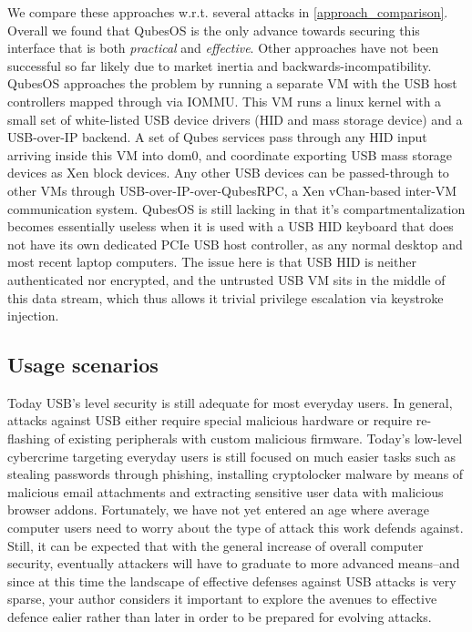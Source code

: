 \documentclass[12pt,a4paper,notitlepage]{article}
\begin{document}
We compare these approaches w.r.t. several attacks in \ref{approach_comparison}. Overall we found that QubesOS is the
only advance towards securing this interface that is both \emph{practical} and \emph{effective}. Other approaches have
not been successful so far likely due to market inertia and backwards-incompatibility.
QubesOS approaches the problem by running a separate VM with the USB host controllers mapped through via IOMMU. This VM
runs a linux kernel with a small set of white-listed USB device drivers (HID and mass storage device) and a USB-over-IP
backend. A set of Qubes services pass through any HID input arriving inside this VM into dom0, and coordinate exporting
USB mass storage devices as Xen block devices. Any other USB devices can be passed-through to other VMs through
USB-over-IP-over-QubesRPC, a Xen vChan-based inter-VM communication system.
QubesOS is still lacking in that it's compartmentalization becomes essentially useless when it is used with a USB HID
keyboard that does not have its own dedicated PCIe USB host controller, as any normal desktop and most recent laptop
computers. The issue here is that USB HID is neither authenticated nor encrypted, and the untrusted USB VM sits in the
middle of this data stream, which thus allows it trivial privilege escalation via keystroke injection.

\subsection{Usage scenarios}

Today USB's level security is still adequate for most everyday users. In general, attacks against USB either require
special malicious hardware or require re-flashing of existing peripherals with custom malicious firmware. Today's
low-level cybercrime targeting everyday users is still focused on much easier tasks such as stealing passwords through
phishing, installing cryptolocker malware by means of malicious email attachments and extracting sensitive user data
with malicious browser addons. Fortunately, we have not yet entered an age where average computer users need to worry
about the type of attack this work defends against. Still, it can be expected that with the general increase of overall
computer security, eventually attackers will have to graduate to more advanced means--and since at this time the
landscape of effective defenses against USB attacks is very sparse, your author considers it important to explore the
avenues to effective defence ealier rather than later in order to be prepared for evolving attacks.
\end{document}
